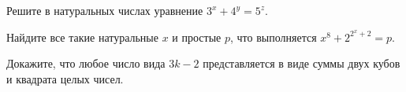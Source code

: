 \begin{problem}[3<sup>x</sup> &plus; 4<sup>y</sup> = 5<sup>z</sup>]
	Решите в натуральных числах уравнение $3^x + 4^y = 5^z$.
\end{problem}

\begin{problem}[x<sup>8</sup> &plus; 2<sup>2<sup>x</sup>&plus;2</sup> = p]
	Найдите все такие натуральные $x$ и простые $p$, что выполняется $x^8 + 2^{2^x+2} = p$.
\end{problem}

\begin{problem}
	Докажите, что любое число вида $3k - 2$ представляется в виде суммы двух кубов и квадрата целых чисел.
\end{problem}

